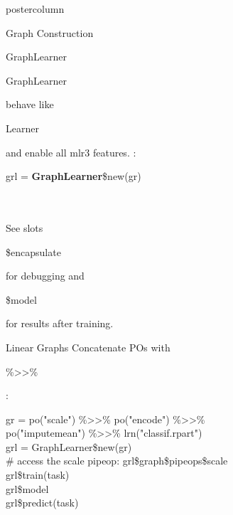 \documentclass{beamer}
\newcommand{\codeinline}[1]{\begin{codeboxinline}#1\end{codeboxinline}}
\begin{document}
\begin{frame}[fragile]{}
\begin{columns}
\begin{column}{.245\textwidth}
\begin{beamercolorbox}[center]{postercolumn}
\begin{minipage}{.98\textwidth}
{\begin{myblock}{Graph Construction}
\begin{codeboxmultiline}[width=23cm]
              \end{codeboxmultiline}
            \end{myblock}
            \vspace{-0.5em}
            \begin{myblock}{GraphLearner}
              \vspace{-0.5em}
              \codeinline{GraphLearner} behave like \codeinline{Learner} and enable all mlr3 features.
              : \codeinline{grl = \textbf{GraphLearner}\$new(gr)}\\
              \\
              See slots \codeinline{\$encapsulate} for debugging and \codeinline{\$model} for results after training.
            \end{myblock}
            \begin{myblock}{Linear Graphs}
              \vspace{-0.5em}
              Concatenate POs with \codeinline{\%>{}>\%}:
              \\
              \begin{codeboxexample}
                {\footnotesize
                gr = po("scale") \%>{}>\% po("encode") \%>{}>\%\\
                \hspace*{1ex} po("imputemean") \%>{}>\% lrn("classif.rpart")\\
                grl = GraphLearner\$new(gr)\\
                \# access the scale pipeop:
                grl\$graph\$pipeops\$scale\\
                grl\$train(task)\\
                grl\$model\\
                grl\$predict(task)\\
}
\end{codeboxexample}
\end{myblock}}
\end{minipage}
\end{beamercolorbox}
\end{column}
\end{columns}
\end{frame}
\end{document}

